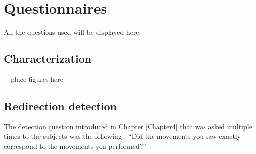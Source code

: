 
\chapter{Questionnaires} %

\label{AppendixA} %

All the questions used will be displayed here.

\section{Characterization}

---place figures here---

\section{Redirection detection}

The detection question introduced in Chapter \ref{Chapter4} that was asked multiple times to the subjects was the following : ``Did the movements you saw exactly correspond to the movements you performed?''
